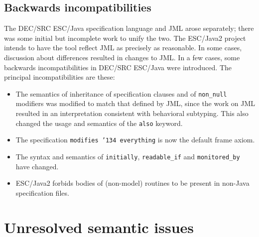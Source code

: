 \documentclass{llncs}
\begin{document}
\subsection{Backwards incompatibilities}
The DEC/SRC ESC/Java specification language and JML arose separately;
there was some initial but incomplete work to unify the two.  The
ESC/Java2 project intends to have the tool reflect JML as precisely as
reasonable.  In some cases, discussion about differences resulted in
changes to JML.  In a few cases, some backwards incompatibilities in
DEC/SRC ESC/Java were introduced.  The principal incompatibilities are
these:
\setlength{\partopsep}{0in}\setlength{\parskip}{0in}\setlength{\itemsep}{0in}\setlength{\topsep}{0in}
\begin{itemize}
\setlength{\partopsep}{0in}\setlength{\parskip}{0in}\setlength{\itemsep}{0in}\setlength{\topsep}{0in}
\item The semantics of inheritance of specification clauses and of
  \texttt{non\_null} modifiers was modified to match that defined by
  JML, since the work on JML resulted in an interpretation consistent
  with behavioral subtyping.  This also changed the usage and
  semantics of the \texttt{also} keyword.
\item The specification \texttt{modifies \char'134 everything} is now
  the default frame axiom.
\item The syntax and semantics of \texttt{initially},
  \texttt{readable\_if} and \texttt{monitored\_by} have changed.
\item ESC/Java2 forbids bodies of (non-model) routines to be present
  in non-Java specification files.
\end{itemize}

\section{Unresolved semantic issues}
\end{document}
